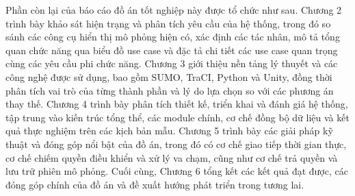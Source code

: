 \documentclass[../DoAn.tex]{subfiles}
\begin{document}
Phần còn lại của báo cáo đồ án tốt nghiệp này được tổ chức như sau. Chương 2
trình bày khảo sát hiện trạng và phân tích yêu cầu của hệ thống, trong đó so
sánh các công cụ hiển thị mô phỏng hiện có, xác định các tác nhân, mô tả tổng
quan chức năng qua biểu đồ use case và đặc tả chi tiết các use case quan trọng
cùng các yêu cầu phi chức năng. Chương 3 giới thiệu nền tảng lý thuyết và các
công nghệ được sử dụng, bao gồm \gls{SUMO}, \gls{TraCI}, Python và Unity, đồng
thời phân tích vai trò của từng thành phần và lý do lựa chọn so với các phương án
thay thế. Chương 4 trình bày phân tích thiết kế, triển khai và đánh giá hệ thống,
tập trung vào kiến trúc tổng thể, các module chính, cơ chế đồng bộ dữ liệu và
kết quả thực nghiệm trên các kịch bản mẫu. Chương 5 trình bày các giải pháp kỹ
thuật và đóng góp nổi bật của đồ án, trong đó có cơ chế giao tiếp thời gian thực,
cơ chế chiếm quyền điều khiển và xử lý va chạm, cũng như cơ chế trả quyền và lưu
trữ phiên mô phỏng. Cuối cùng, Chương 6 tổng kết các kết quả đạt được, các đóng
góp chính của đồ án và đề xuất hướng phát triển trong tương lai.
\end{document}
